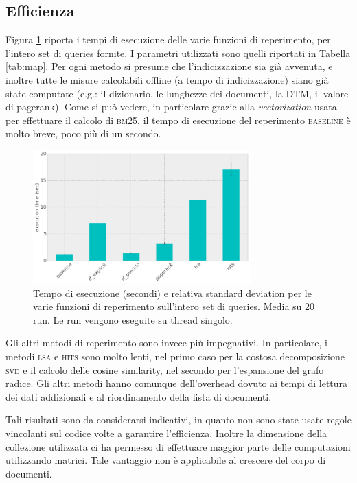 \subsection{Efficienza}
\label{sec:efficienza}
Figura \ref{fig:efficiency} riporta i tempi di esecuzione delle varie funzioni di reperimento, per l'intero set di queries fornite. I parametri utilizzati sono quelli riportati in Tabella \ref{tab:map}. Per ogni metodo si presume che l'indicizzazione sia gi\`a avvenuta, e inoltre tutte le misure calcolabili offline (a tempo di indicizzazione) siano gi\`a state computate (e.g.: il dizionario, le lunghezze dei documenti, la DTM, il valore di pagerank). Come si pu\`o vedere, in particolare grazie alla \textit{vectorization} usata per effettuare il calcolo di \textsc{bm25}, il tempo di esecuzione del reperimento \textsc{baseline} \`e molto breve, poco pi\`u di un secondo. 
\begin{figure}[htpb]
	\begin{center}
		\includegraphics[width=0.75\textwidth]{figures/efficiency.png}
		\caption{Tempo di esecuzione (secondi) e relativa standard deviation per le varie funzioni di reperimento sull'intero set di queries. Media su 20 run. Le run vengono eseguite su thread singolo.}
		\label{fig:efficiency}
	\end{center}
\end{figure}
Gli altri metodi di reperimento sono invece pi\`u impegnativi. In particolare, i metodi \textsc{lsa} e \textsc{hits} sono molto lenti, nel primo caso per la costosa decomposizione \textsc{svd} e il calcolo delle cosine similarity, nel secondo per l'espansione del grafo radice. Gli altri metodi hanno comunque dell'overhead dovuto ai tempi di lettura dei dati addizionali e al riordinamento della lista di documenti.

Tali risultati sono da considerarsi indicativi, in quanto non sono state usate regole vincolanti sul codice volte a garantire l'efficienza. Inoltre la dimensione della collezione  utilizzata ci ha permesso di effettuare maggior parte delle computazioni utilizzando matrici. Tale vantaggio non \`e applicabile al crescere del corpo di documenti.

